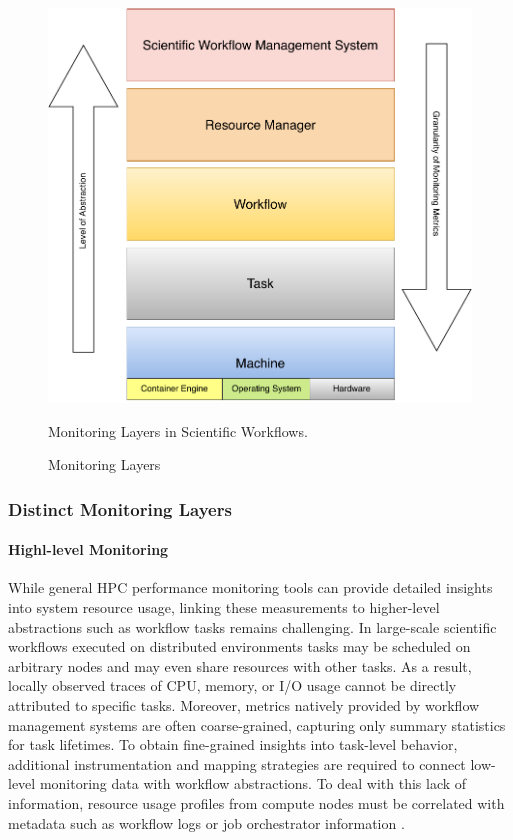 \begin{figure}[H]
    \centering
    \includegraphics[scale=0.5]{fig/02/02-monitoring-layers.pdf}
    \caption{Monitoring Layers}
    \label{fig:02-monitoring-layers}
    \tiny
    Monitoring Layers in Scientific Workflows.
\end{figure}

\subsubsection{Distinct Monitoring Layers}
\label{sec:background_monitoring_layers}
\paragraph{Highl-level Monitoring}
While general HPC performance monitoring tools can provide detailed insights into system resource usage, linking these measurements to higher-level abstractions such as workflow tasks remains challenging. In large-scale scientific workflows executed on distributed environments tasks may be scheduled on arbitrary nodes and may even share resources with other tasks. As a result, locally observed traces of CPU, memory, or I/O usage cannot be directly attributed to specific tasks.  Moreover, metrics natively provided by workflow management systems are often coarse-grained, capturing only summary statistics for task lifetimes. To obtain fine-grained insights into task-level behavior, additional instrumentation and mapping strategies are required to connect low-level monitoring data with workflow abstractions. To deal with this lack of information, resource usage profiles from compute nodes must be correlated with metadata such as workflow logs or job orchestrator information \cite{Witzke2024}.



